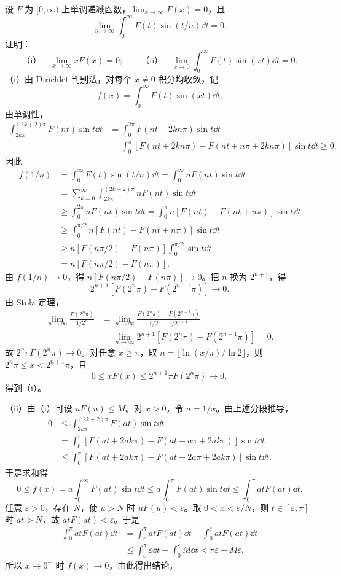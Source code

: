 设 $F$ 为 $[0,\infty)$ 上单调递减函数，$\lim_{x\to\infty}F(x)=0$，且
\[
\lim_{n\to\infty}\int_0^\infty F(t)\sin(t/n)\dd t=0.
\]
证明：
\[
\text{（i）}\quad\lim_{x\to\infty}xF(x)=0;\qquad
\text{（ii）}\quad\lim_{x\to0}\int_0^\infty F(t)\sin(xt)\dd t=0.
\]
\prooftext （i）由 Dirichlet 判别法，对每个 $x\ne0$ 积分均收敛，记
\[
f(x)=\int_0^\infty F(t)\sin(xt)\dd t.
\]
由单调性，
\begin{align*}
\int_{2k\pi}^{(2k+2)\pi}F(nt)\sin t\dd t
&=\int_0^{2\pi}F(nt+2kn\pi)\sin t\dd t\\
&=\int_0^\pi[F(nt+2kn\pi)-F(nt+n\pi+2kn\pi)]\sin t\dd t\ge0.
\end{align*}
因此
\begin{align*}
f(1/n)&=\int_0^\infty F(t)\sin(t/n)\dd t=\int_0^\infty nF(nt)\sin t\dd t\\
&=\sum_{k=0}^\infty\int_{2k\pi}^{(2k+2)\pi}nF(nt)\sin t\dd t\\
&\ge\int_0^{2\pi}nF(nt)\sin t\dd t
=\int_0^\pi n[F(nt)-F(nt+n\pi)]\sin t\dd t\\
&\ge\int_0^{\pi/2}n[F(nt)-F(nt+n\pi)]\sin t\dd t\\
&\ge n[F(n\pi/2)-F(n\pi)]\int_0^{\pi/2}\sin t\dd t\\
&=n[F(n\pi/2)-F(n\pi)].
\end{align*}
由 $f(1/n)\to0$，得 $n[F(n\pi/2)-F(n\pi)]\to0$。把 $n$ 换为 $2^{n+1}$，得
\[
2^{n+1}[F(2^n\pi)-F(2^{n+1}\pi)]\to0.
\]
由 Stolz 定理，
\begin{align*}
\lim_{n\to\infty}\frac{F(2^n\pi)}{1/2^n}
&=\lim_{n\to\infty}\frac{F(2^n\pi)-F(2^{n+1}\pi)}{1/2^n-1/2^{n+1}}\\
&=\lim_{n\to\infty}2^{n+1}[F(2^n\pi)-F(2^{n+1}\pi)]=0.
\end{align*}
故 $2^n\pi F(2^n\pi)\to0$。对任意 $x\ge\pi$，取
$n=\lfloor\ln(x/\pi)/\ln2\rfloor$，则 $2^n\pi\le x<2^{n+1}\pi$，且
\[
0\le xF(x)\le2^{n+1}\pi F(2^n\pi)\to0,
\]
得到（i）。

（ii）由（i）可设 $uF(u)\le M$。对 $x>0$，令 $a=1/x$。由上述分段推导，
\begin{align*}
0&\le\int_{2k\pi}^{(2k+2)\pi}F(at)\sin t\dd t\\
&=\int_0^\pi[F(at+2ak\pi)-F(at+a\pi+2ak\pi)]\sin t\dd t\\
&\le\int_0^\pi[F(at+2ak\pi)-F(at+2a\pi+2ak\pi)]\sin t\dd t.
\end{align*}
于是求和得
\[
0\le f(x)=a\int_0^\infty F(at)\sin t\dd t
\le a\int_0^\pi F(at)\sin t\dd t\le\int_0^\pi atF(at)\dd t.
\]
任意 $\varepsilon>0$，存在 $N$，使 $u>N$ 时 $uF(u)<\varepsilon$。取 $0<x<\varepsilon/N$，则 $t\in[\varepsilon,\pi]$ 时 $at>N$，故 $atF(at)<\varepsilon$。于是
\begin{align*}
\int_0^\pi atF(at)\dd t
&=\int_\varepsilon^\pi atF(at)\dd t+\int_0^\varepsilon atF(at)\dd t\\
&\le\int_\varepsilon^\pi\varepsilon\dd t+\int_0^\varepsilon M\dd t
<\pi\varepsilon+M\varepsilon.
\end{align*}
所以 $x\to0^+$ 时 $f(x)\to0$，由此得出结论。

